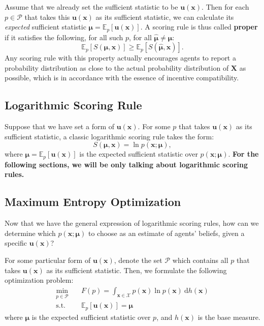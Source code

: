 \documentclass[12pt]{article}
\begin{document}
Assume that we already set the sufficient statistic to be $\mathbf{u}(\mathbf{x})$. Then for each $p\in \mathcal{P}$ that takes this $\mathbf{u}(\mathbf{x})$ as its sufficient statistic, we can calculate its \textit{expected} sufficient statistic $\bm{\mu}=\mathbb{E}_p[\mathbf{u}(\mathbf{x})]$. A scoring rule is thus called \textbf{proper} if it satisfies the following, for all such $p$, for all $\bm{\hat{\mu}}\neq\bm{\mu}$:
\[\mathbb{E}_p[S(\bm{\mu},\mathbf{x})]\geqslant \mathbb{E}_p[S(\bm{\hat{\mu}},\mathbf{x})].\]
Any scoring rule with this property actually encourages agents to report a probability distribution as close to the actual probability distribution of $\mathbf{X}$ as possible, which is in accordance with the essence of incentive compatibility.

\subsection{Logarithmic Scoring Rule}
Suppose that we have set a form of $\mathbf{u}(\mathbf{x})$. For some $p$ that takes $\mathbf{u}(\mathbf{x})$ as its sufficient statistic, a classic logarithmic scoring rule takes the form:
\[S(\bm{\mu},\mathbf{x})=\ln p(\mathbf{x};\bm{\mu}),\]
where $\bm{\mu}=\mathbb{E}_p[\mathbf{u}(\mathbf{x})]$ is the expected sufficient statistic over $p(\mathbf{x};\bm{\mu})$. \textbf{For the following sections, we will be only talking about logarithmic scoring rules.}

\subsection{Maximum Entropy Optimization}
Now that we have the general expression of logarithmic scoring rules, how can we determine which $p(\mathbf{x};\bm{\mu})$ to choose as an estimate of agents' beliefs, given a specific $\mathbf{u}(\mathbf{x})$? 

For some particular form of $\mathbf{u}(\mathbf{x})$, denote the set $\mathcal{P}$ which contains all $p$ that takes $\mathbf{u}(\mathbf{x})$ as its sufficient statistic. Then, we formulate the following optimization problem:
\begin{align*}
    \min_{p\in \mathcal{P}} &\quad F(p)=\int_{\mathbf{x}\in \mathcal{X}}p(\mathbf{x})\ln p(\mathbf{x})\ \mathrm{d}h(\mathbf{x})\\
    \mathrm{s.t.} &\quad \mathbb{E}_p[\mathbf{u}(\mathbf{x})]=\bm{\mu}
\end{align*}
where $\bm{\mu}$ is the expected sufficient statistic over $p$, and $h(\mathbf{x})$ is the base measure.
\end{document}
